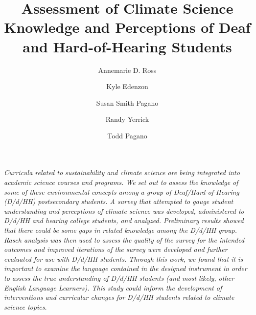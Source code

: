 \documentclass[11.5pt]{sig-alternate} %
\makeatletter
\let\oldabstract\abstract
\let\oldendabstract\endabstract
\renewenvironment{abstract} %
{\renewenvironment{quotation}%
               {\list{}{\addtolength{\leftmargin}{1em} %
                        \listparindent 1.5em%
                        \itemindent    \listparindent%
                        \rightmargin   \leftmargin%
                        \parsep        \z@ \@plus\p@}%
                \item\relax}%
               {\endlist}%
\oldabstract}
{\oldendabstract}
\makeatother
\begin{document}
\title{Assessment of Climate Science Knowledge and Perceptions of Deaf and Hard-of-Hearing Students}

\author[1]{\large \color{blue}Annemarie D. Ross}
\author[1]{\large \color{blue}Kyle Edenzon}
\author[2]{\large \color{blue}Susan Smith Pagano}
\author[3]{\large \color{blue}Randy Yerrick}
\author[1]{\large \color{blue}Todd Pagano}


\toappear{}
\maketitle
\begin{@twocolumnfalse} 
\begin{abstract}
\item 
\textit{Curricula related to sustainability and climate science are being integrated into academic science courses and programs.  We set out to assess the knowledge of some of these environmental concepts among a group of Deaf/Hard-of-Hearing (D/d/HH) postsecondary students.  A survey that attempted to gauge student understanding and perceptions of climate science was developed, administered to D/d/HH and hearing college students, and analyzed.  Preliminary results showed that there could be some gaps in related knowledge among the D/d/HH group.  Rasch analysis was then used to assess the quality of the survey for the intended outcomes and improved iterations of the survey were developed and further evaluated for use with D/d/HH students.  Through this work, we found that it is important to examine the language contained in the designed instrument in order to assess the true understanding of D/d/HH students (and most likely, other English Language Learners).  This study could inform the development of interventions and curricular changes for D/d/HH students related to climate science topics.}
\\ \\ 
\end{abstract}
\end{@twocolumnfalse}

\end{document}
